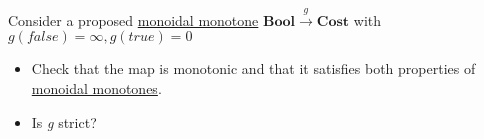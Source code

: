 Consider a proposed \href{doc/1 math/Seven Sketches in Compositionality/Chapter 2: Resource theories/2 Symmetric monoidal preorders/5 Monoidal monotone maps/1 Monoidal monotone}{monoidal monotone} $\mathbf{Bool}\xrightarrow{g}\mathbf{Cost}$ with $g(false)=\infty, g(true)=0$
    \begin{itemize}
      \item Check that the map is monotonic and that it satisfies both properties of \href{doc/1 math/Seven Sketches in Compositionality/Chapter 2: Resource theories/2 Symmetric monoidal preorders/5 Monoidal monotone maps/1 Monoidal monotone}{monoidal monotones}.
      \item Is \emph{g} strict?\end{itemize}